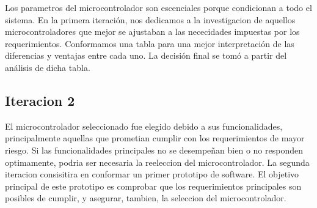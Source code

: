 Los parametros del microcontrolador son escenciales porque condicionan a todo el sistema. En la primera iteración, nos dedicamos a la investigacion de aquellos microcontroladores que mejor se ajustaban a las nececidades impuestas por los requerimientos. Conformamos una tabla para una mejor interpretación de las diferencias y ventajas entre cada uno. La decisión final se tomó a partir del análisis de dicha tabla.



\subsection{Iteracion 2} %
\label{sub:iteracion_2}

El microcontrolador seleccionado fue elegido debido a sus funcionalidades, principalmente aquellas que prometian cumplir con los requerimientos de mayor riesgo. Si las funcionalidades principales no se desempeñan bien o no responden optimamente, podria ser necesaria la reeleccion del microcontrolador. La segunda iteracion consisitira en conformar un primer prototipo de software. El objetivo principal de este prototipo es comprobar que los requerimientos principales son posibles de cumplir, y asegurar, tambien, la seleccion del microcontrolador.


